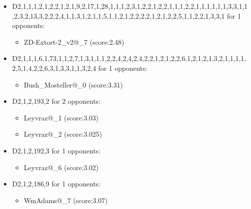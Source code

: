\begin{appendices}
\begin{itemize}
        \item D2,1,1,1,2,1,2,2,1,2,1,9,2,17,1,28,1,1,1,2,3,1,2,2,1,2,2,1,1,1,2,2,1,1,1,1,1,1,3,3,1,1,2,3,2,13,3,2,2,2,4,1,1,3,1,2,1,1,5,1,1,2,1,2,2,2,2,1,2,1,2,2,5,1,1,2,2,1,3,3,1 for 1 opponents:
        \begin{multicols}{3}
            \begin{itemize}
                \item ZD-Extort-2\_v2@\_7 (score:2.48)
            \end{itemize}
        \end{multicols}

        \item D2,1,1,1,6,1,73,1,1,2,7,1,3,1,1,1,2,2,4,2,4,2,4,2,2,1,2,1,2,2,6,1,2,1,2,1,3,2,1,1,1,1,2,5,1,4,2,2,6,3,1,3,3,1,1,3,2,4 for 1 opponents:
        \begin{multicols}{3}
            \begin{itemize}
                \item Bush\_Mosteller@\_0 (score:3.31)
            \end{itemize}
        \end{multicols}

        \item D2,1,2,193,2 for 2 opponents:
        \begin{multicols}{3}
            \begin{itemize}
                \item Leyvraz@\_1 (score:3.03)
                \item Leyvraz@\_2 (score:3.025)
            \end{itemize}
        \end{multicols}

        \item D2,1,2,192,3 for 1 opponents:
        \begin{multicols}{3}
            \begin{itemize}
                \item Leyvraz@\_6 (score:3.02)
            \end{itemize}
        \end{multicols}

        \item D2,1,2,186,9 for 1 opponents:
        \begin{multicols}{3}
            \begin{itemize}
                \item WmAdams@\_7 (score:3.07)
            \end{itemize}
        \end{multicols}


\end{itemize}
\end{appendices}
